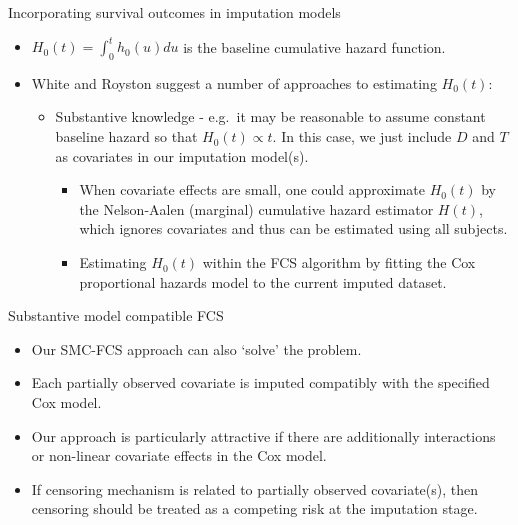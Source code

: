 \documentclass[ignorenonframetext,]{beamer}
\providecommand{\tightlist}{%
  \setlength{\itemsep}{0pt}\setlength{\parskip}{0pt}}
\begin{document}
\begin{frame}{Incorporating survival outcomes in imputation models}
\protect\hypertarget{incorporating-survival-outcomes-in-imputation-models-2}{}

\begin{itemize}
\item
  \(H_{0}(t)=\int^{t}_{0} h_{0}(u) du\) is the baseline cumulative
  hazard function.
\item
  White and Royston suggest a number of approaches to estimating
  \(H_{0}(t)\):

  \begin{itemize}
  \tightlist
  \item
    Substantive knowledge - e.g.~it may be reasonable to assume constant
    baseline hazard so that \(H_{0}(t) \propto t\). In this case, we
    just include \(D\) and \(T\) as covariates in our imputation
    model(s).

    \begin{itemize}
    \tightlist
    \item
      When covariate effects are small, one could approximate
      \(H_{0}(t)\) by the Nelson-Aalen (marginal) cumulative hazard
      estimator \(H(t)\), which ignores covariates and thus can be
      estimated using all subjects.
    \item
      Estimating \(H_{0}(t)\) within the FCS algorithm by fitting the
      Cox proportional hazards model to the current imputed dataset.
    \end{itemize}
  \end{itemize}
\end{itemize}

\end{frame}

\begin{frame}{Substantive model compatible FCS}
\protect\hypertarget{substantive-model-compatible-fcs-1}{}

\begin{itemize}
\tightlist
\item
  Our SMC-FCS approach can also `solve' the problem.
\item
  Each partially observed covariate is imputed compatibly with the
  specified Cox model.
\item
  Our approach is particularly attractive if there are additionally
  interactions or non-linear covariate effects in the Cox model.
\item
  If censoring mechanism is related to partially observed covariate(s),
  then censoring should be treated as a competing risk at the imputation
  stage.
\end{itemize}

\end{frame}
\end{document}
